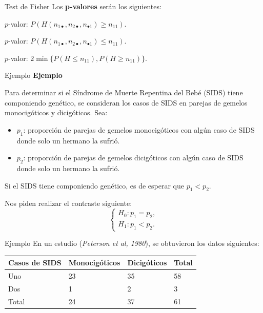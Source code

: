 \documentclass[
  ignorenonframetext,
]{beamer}
\begin{document}
\begin{frame}{Test de Fisher}
\protect\hypertarget{test-de-fisher-4}{}
Los \textbf{p-valores} serán los siguientes:

\(p\)-valor:
\(P(H(n_{1\bullet},n_{2\bullet},n_{\bullet1})\geq n_{11})\).

\(p\)-valor:
\(P(H(n_{1\bullet},n_{2\bullet},n_{\bullet1})\leq n_{11})\).

\(p\)-valor: \(2\min\{P(H\leq n_{11}), P(H\geq n_{11})\}\).
\end{frame}

\begin{frame}{Ejemplo}
\protect\hypertarget{ejemplo-36}{}
\textbf{Ejemplo}

Para determinar si el Síndrome de Muerte Repentina del Bebé (SIDS) tiene
componiendo genético, se consideran los casos de SIDS en parejas de
gemelos monocigóticos y dicigóticos. Sea:

\begin{itemize}[<+->]
\item
  \(p_1\): proporción de parejas de gemelos monocigóticos con algún caso
  de SIDS donde solo un hermano la sufrió.
\item
  \(p_2\): proporción de parejas de gemelos dicigóticos con algún caso
  de SIDS donde solo un hermano la sufrió.
\end{itemize}

Si el SIDS tiene componiendo genético, es de esperar que \(p_1<p_2\).

Nos piden realizar el contraste siguiente: \[
\left\{\begin{array}{l}
H_0:p_1=p_2,\\
H_1:p_1< p_2.
\end{array}\right.
\]
\end{frame}

\begin{frame}{Ejemplo}
\protect\hypertarget{ejemplo-37}{}
En un estudio (\emph{Peterson et al, 1980}), se obtuvieron los datos
siguientes:

\begin{longtable}[]{@{}llll@{}}
\toprule
Casos de SIDS & Monocigóticos & Dicigóticos & Total\tabularnewline
\midrule
\endhead
Uno & 23 & 35 & 58\tabularnewline
Dos & 1 & 2 & 3\tabularnewline
Total & 24 & 37 & 61\tabularnewline
\bottomrule
\end{longtable}
\end{frame}
\end{document}
